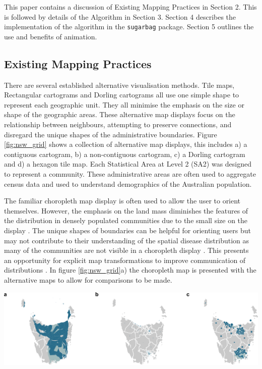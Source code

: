 This paper contains a discussion of Existing Mapping Practices in
Section 2. This is followed by details of the Algorithm in Section 3.
Section 4 describes the implementation of the algorithm in the
\texttt{sugarbag} package. Section 5 outlines the use and benefits of
animation.

\hypertarget{existing-mapping-practices}{%
\subsection{Existing Mapping
Practices}\label{existing-mapping-practices}}

There are several established alternative visualisation methods. Tile
maps, Rectangular cartograms \citep{ORC} and Dorling cartograms
\citep{ACTUC} all use one simple shape to represent each geographic
unit. They all minimise the emphasis on the size or shape of the
geographic areas. These alternative map displays focus on the
relationship between neighbours, attempting to preserve connections, and
disregard the unique shapes of the administrative boundaries. Figure
\ref{fig:nsw_grid} shows a collection of alternative map displays, this
includes a) a contiguous cartogram, b) a non-contiguous cartogram, c) a
Dorling cartogram and d) a hexagon tile map. Each Statistical Area at
Level 2 (SA2) \citep{abs2011} was designed to represent a community.
These administrative areas are often used to aggregate census data and
used to understand demographics of the Australian population.

The familiar choropleth map display is often used to allow the user to
orient themselves. However, the emphasis on the land mass diminishes the
features of the distribution in densely populated communities due to the
small size on the display \citep{ACTUC}. The unique shapes of boundaries
can be helpful for orienting users but may not contribute to their
understanding of the spatial disease distribution as many of the
communities are not visible in a choropleth display \citep{TVSSS}. This
presents an opportunity for explicit map transformations to improve
communication of distributions \citep{CBATCC}. In figure
\ref{fig:nsw_grid}a) the choropleth map is presented with the
alternative maps to allow for comparisons to be made.

\begin{Schunk}

\includegraphics[width=0.9\linewidth]{kobakian-cook_files/figure-latex/tas_displays-1} \end{Schunk}

